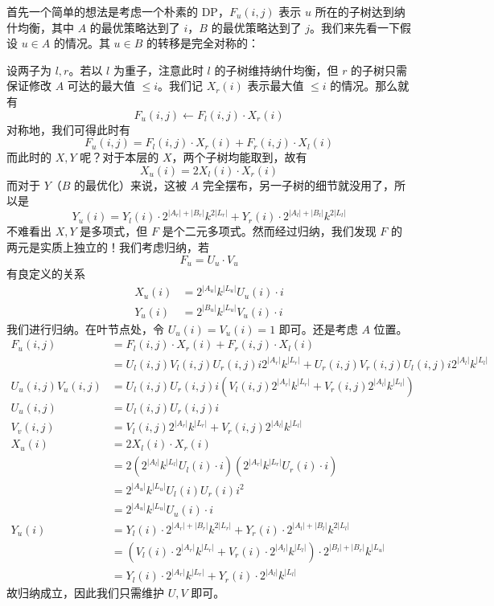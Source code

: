 \documentclass[12pt]{ctexart}
\theoremstyle{theorem}
\theoremstyle{theorem}
\begin{document}
首先一个简单的想法是考虑一个朴素的 DP，$F_u(i, j)$ 表示 $u$ 所在的子树达到纳什均衡，其中 $A$ 的最优策略达到了 $i$，$B$ 的最优策略达到了 $j$。我们来先看一下假设 $u\in A$ 的情况。其 $u\in B$ 的转移是完全对称的：

设两子为 $l, r$。若以 $l$ 为重子，注意此时 $l$ 的子树维持纳什均衡，但 $r$ 的子树只需保证修改 $A$ 可达的最大值 $\le i$。我们记 $X_r(i)$ 表示最大值 $\le i$ 的情况。那么就有
$$
F_u(i,j) \leftarrow F_l(i,j) \cdot X_r(i)
$$
对称地，我们可得此时有
$$
F_u(i,j) = F_l(i,j) \cdot X_r(i) + F_r(i,j) \cdot X_l(i)
$$
而此时的 $X,Y$ 呢？对于本层的 $X$，两个子树均能取到，故有
$$
X_u(i) = 2X_l(i)\cdot X_r(i)
$$
而对于 $Y$（$B$ 的最优化）来说，这被 $A$ 完全摆布，另一子树的细节就没用了，所以是
$$
Y_u(i) = Y_l(i) \cdot 2^{|A_r|+|B_r|}k^{2|L_r|} + Y_r(i) \cdot 2^{|A_l|+|B_l|}k^{2|L_l|}
$$
不难看出 $X,Y$ 是多项式，但 $F$ 是个二元多项式。然而经过归纳，我们发现 $F$ 的两元是实质上独立的！我们考虑归纳，若
$$
F_u = U_u \cdot V_u
$$
有良定义的关系
$$
\begin{aligned}
X_u(i) &= 2^{|A_u|} k^{|L_u|} U_u(i)\cdot i\\
Y_u(i) &= 2^{|B_u|} k^{|L_u|} V_u(i)\cdot i
\end{aligned}
$$
我们进行归纳。在叶节点处，令 $U_u(i)=V_u(i)=1$ 即可。还是考虑 $A$ 位置。
\begin{align*}
F_u(i,j) &= F_l(i,j) \cdot X_r(i) + F_r(i,j) \cdot X_l(i)\\
&= U_l(i,j)V_l(i,j)U_r(i,j)i 2^{|A_r|} k^{|L_r|} +U_r(i,j)V_r(i,j)U_l(i,j)i 2^{|A_l|} k^{|L_l|}\\
U_u(i,j)V_u(i,j)&= U_l(i,j)U_r(i,j) i\left( V_l(i,j) 2^{|A_r|} k^{|L_r|}+ V_r(i,j) 2^{|A_l|} k^{|L_l|} \right)\\
U_u(i,j)&=U_l(i,j)U_r(i,j) i\\
V_v(i,j)&=V_l(i,j) 2^{|A_r|} k^{|L_r|}+ V_r(i,j) 2^{|A_l|} k^{|L_l|}\\
X_u(i)&=2 X_l(i)\cdot X_r(i)\\
&=2 \left(2^{|A_l|} k^{|L_l|} U_l(i)\cdot i\right) \left(2^{|A_r|} k^{|L_r|} U_r(i)\cdot i\right)\\
&=2^{|A_u|}k^{|L_u|} U_l(i)U_r(i)i^2\\
&=2^{|A_u|}k^{|L_u|} U_u(i)\cdot i\\
Y_u(i)&= Y_l(i) \cdot 2^{|A_r|+|B_r|}k^{2|L_r|} + Y_r(i) \cdot 2^{|A_l|+|B_l|}k^{2|L_l|}\\
&= \left( V_l(i) \cdot 2^{|A_r|}k^{|L_r|} + V_r(i) \cdot 2^{|A_l|}k^{|L_l|} \right)\cdot 2^{|B_l|+|B_r|} k^{|L_u|}\\
&= Y_l(i) \cdot 2^{|A_r|}k^{|L_r|} + Y_r(i) \cdot 2^{|A_l|}k^{|L_l|} 
\end{align*}
故归纳成立，因此我们只需维护 $U,V$ 即可。
\end{document}
